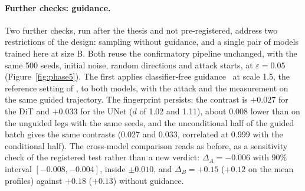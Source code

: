 \documentclass{article}
\begin{document}
\paragraph{Further checks: guidance.} Two further checks, run after the thesis and not pre-registered, address two restrictions of the design: sampling without guidance, and a single pair of models trained here at size B. Both reuse the confirmatory pipeline unchanged, with the same 500 seeds, initial noise, random directions and attack starts, at $\varepsilon{=}0.05$ (Figure~\ref{fig:phase5}). The first applies classifier-free guidance~\cite{ho2022classifier} at scale 1.5, the reference setting of \citet{ma2024sit}, to both models, with the attack and the measurement on the same guided trajectory. The fingerprint persists: the contrast is $+0.027$ for the DiT and $+0.033$ for the UNet ($d$ of 1.02 and 1.11), about 0.008 lower than on the unguided legs with the same seeds, and the unconditional half of the guided batch gives the same contrasts (0.027 and 0.033, correlated at 0.999 with the conditional half). The cross-model comparison reads as before, as a sensitivity check of the registered test rather than a new verdict: $\Delta_A = -0.006$ with 90\% interval $[-0.008, -0.004]$, inside $\pm 0.010$, and $\Delta_B = +0.15$ ($+0.12$ on the mean profiles) against $+0.18$ ($+0.13$) without guidance.
\end{document}
